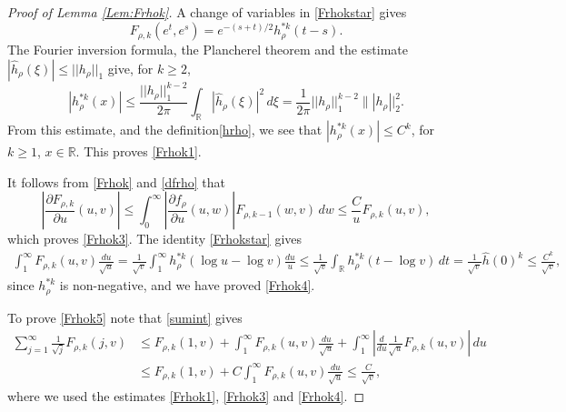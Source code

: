 \documentclass{article}
\numberwithin{equation}{section}
\numberwithin{figure}{section}
\theoremstyle{plain}
\theoremstyle{plain}
\numberwithin{thm}{section}
\theoremstyle{remark}
\newcommand{\R}{\mathbb{R}}
\let \le \leqslant
\let \ge \geqslant
\begin{document}
\begin{proof}[Proof of Lemma \ref{Lem:Frhok}]
A change of variables in \eqref{Frhokstar} gives
\begin{equation}\label{Frhokhrho}
F_{\rho,k}(e^t,e^s)=e^{-(s+t)/2}h_\rho^{*k}(t-s).
\end{equation}
The Fourier inversion formula, the Plancherel theorem and the estimate $|\hat{h}_\rho(\xi)|\le ||h_\rho||_1$ give, for $k\ge 2$,
\begin{equation*}
|h_\rho^{*k}(x)|\le \frac{||h_\rho||_1^{k-2}}{2\pi}\int_\R |\hat{h}_\rho(\xi)|^2\,d\xi=\frac 1{2\pi}||h_\rho||_1^{k-2}\||h_\rho||_2^2.
\end{equation*}
From this estimate, and the definition\eqref{hrho}, we see that $|h_\rho^{*k}(x)|\le C^k$, for $k\ge 1$, $x\in\R$. This proves \eqref{Frhok1}.

It follows from \eqref{Frhok} and \eqref{dfrho} that
\begin{equation}
    \left|\frac{\partial F_{\rho,k}}{\partial u}(u,v)\right|\le
    \int_0^\infty\left|\frac{\partial f_{\rho}}{\partial u}(u,w)\right|
    F_{\rho,k-1}(w,v)\,dw\le\frac Cu F_{\rho,k}(u,v),
\end{equation}
which proves \eqref{Frhok3}. The identity \eqref{Frhokstar} gives
\begin{align*}
    \int_1^\infty F_{\rho,k}(u,v)\frac{du}{\sqrt{u}}=\frac 1{\sqrt{v}}
    \int_1^\infty h_\rho^{*k}(\log u-\log v)\frac{du}{u}\le \frac 1{\sqrt{v}}\int_{\R} h_\rho^{*k}(t-\log v)\,dt
    =\frac 1{\sqrt{v}}\hat{h}(0)^k\le \frac{C^k}{\sqrt{v}},
\end{align*}
since $h_\rho^{*k}$ is non-negative, and we have proved \eqref{Frhok4}.

To prove \eqref{Frhok5} note that \eqref{sumint} gives
\begin{align*}
    \sum_{j=1}^\infty\frac 1{\sqrt{j}}F_{\rho,k}(j,v)&\le F_{\rho,k}(1,v)+\int_1^\infty F_{\rho,k}(u,v)\frac{du}{\sqrt{u}}+\int_1^\infty \left|\frac{d}{du}\frac{1}{\sqrt{u}}F_{\rho,k}(u,v)\right|\,du\\
    &\le F_{\rho,k}(1,v)+C\int_1^\infty F_{\rho,k}(u,v)\frac{du}{\sqrt{u}}\le \frac{C}{\sqrt{v}},
\end{align*}
where we used the estimates \eqref{Frhok1}, \eqref{Frhok3} and \eqref{Frhok4}.


\end{proof}
\end{document}

